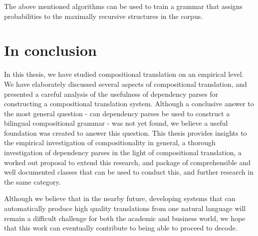 The above mentioned algorithms can be used to train a grammar that assigns probabilities to the maximally recursive structures in the corpus.

\section{In conclusion}

In this thesis, we have studied compositional translation on an empirical level. We have elaborately discussed several aspects of compositional translation, and presented a careful analysis of the usefulness of dependency parses for constructing a compositional translation system. Although a conclusive answer to the most general question - can dependency parses be used to construct a bilingual compositional grammar - was not yet found, we believe a useful foundation was created to answer this question. This thesis provides insights to the empirical investigation of compositionality in general, a thorough investigation of dependency parses in the light of compositional translation, a worked out proposal to extend this research, and package of comprehensible and well documented classes that can be used to conduct this, and further research in the same category. 

Although we believe that in the nearby future, developing systems that can automatically produce high quality translations from one natural language will remain a difficult challenge for both the academic and business world, we hope that this work can eventually contribute to being able to proceed to decode.




%
%